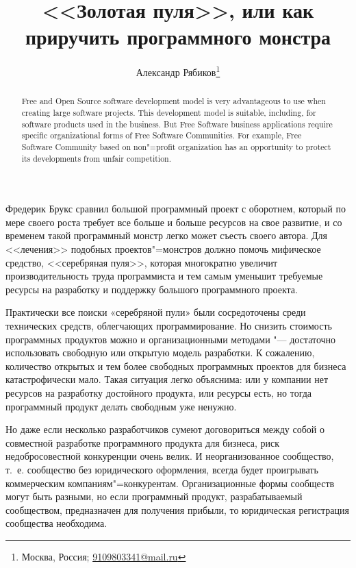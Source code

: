 \documentclass[10pt, a5paper]{article}
\begin{document}
\title{<<Золотая пуля>>, или как приручить программного монстра}%

\author{Александр Рябиков\footnote{Москва, Россия; \url{9109803341@mail.ru}}}
\maketitle

\begin{abstract}
Free and Open Source software development model is very advantageous to use when creating large software projects. This development model is suitable, including, for software products used in the business. But Free Software business applications require specific organizational forms of Free Software Communities. For example, Free Software Community based on non"=profit organization has an opportunity to protect its developments from unfair competition.
\end{abstract}

Фредерик Брукс сравнил большой программный проект с оборотнем, который по мере своего роста требует все больше и больше ресурсов на свое развитие, и со временем такой программный монстр легко может съесть своего автора. Для <<лечения>> подобных проектов"=монстров должно помочь мифическое средство, <<серебряная пуля>>, которая многократно увеличит производительность труда программиста и тем самым уменьшит требуемые ресурсы на разработку и поддержку большого программного проекта.

Практически все поиски «серебряной пули» были сосредоточены среди технических средств, облегчающих программирование. Но снизить стоимость программных продуктов можно и организационными методами "--- достаточно использовать свободную или открытую модель разработки. К сожалению, количество открытых и тем более свободных программных проектов для бизнеса катастрофически мало. Такая ситуация легко объяснима: или у компании нет ресурсов на разработку достойного продукта, или ресурсы есть, но тогда программный продукт делать свободным уже ненужно.

Но даже если несколько разработчиков сумеют договориться между собой о совместной разработке программного продукта для бизнеса, риск недобросовестной конкуренции очень велик. И неорганизованное сообщество, т.~е. сообщество без юридического оформления, всегда будет проигрывать коммерческим компаниям"=конкурентам. Организационные формы сообществ могут быть разными, но если программный продукт, разрабатываемый сообществом, предназначен для получения прибыли, то юридическая регистрация сообщества необходима.
\end{document}
